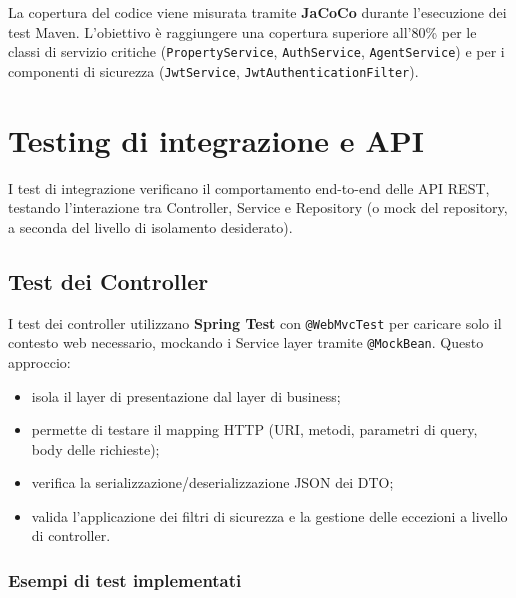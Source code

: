 \documentclass[a4paper,11pt]{report}
\begin{document}
La copertura del codice viene misurata tramite \textbf{JaCoCo} durante l'esecuzione dei test Maven. L'obiettivo è raggiungere una copertura superiore all'80\% per le classi di servizio critiche (\texttt{PropertyService}, \texttt{AuthService}, \texttt{AgentService}) e per i componenti di sicurezza (\texttt{JwtService}, \texttt{JwtAuthenticationFilter}).

\section{Testing di integrazione e API}

I test di integrazione verificano il comportamento end-to-end delle API REST, testando l'interazione tra Controller, Service e Repository (o mock del repository, a seconda del livello di isolamento desiderato).

\subsection{Test dei Controller}

I test dei controller utilizzano \textbf{Spring Test} con \texttt{@WebMvcTest} per caricare solo il contesto web necessario, mockando i Service layer tramite \texttt{@MockBean}. Questo approccio:

\begin{itemize}[nosep]
  \item isola il layer di presentazione dal layer di business;
  \item permette di testare il mapping HTTP (URI, metodi, parametri di query, body delle richieste);
  \item verifica la serializzazione/deserializzazione JSON dei DTO;
  \item valida l'applicazione dei filtri di sicurezza e la gestione delle eccezioni a livello di controller.
\end{itemize}

\subsubsection*{Esempi di test implementati}
\end{document}
